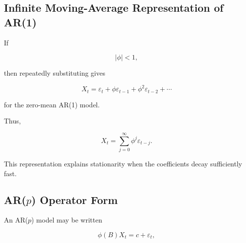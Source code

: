 
\subsection{Infinite Moving-Average Representation of AR(1)}
\label{subsec:ar1-ma-infinity}

If

\[
|\phi|<1,
\]

then repeatedly substituting gives

\[
X_t
=
\varepsilon_t
+
\phi\varepsilon_{t-1}
+
\phi^2\varepsilon_{t-2}
+
\cdots
\]

for the zero-mean AR(1) model.

Thus,

\[
\boxed{
X_t
=
\sum_{j=0}^{\infty}
\phi^j
\varepsilon_{t-j}.
}
\]

This representation explains stationarity when the coefficients decay
sufficiently fast.

\subsection{AR(\(p\)) Operator Form}
\label{subsec:arp-operator-form}

An AR(\(p\)) model may be written

\[
\boxed{
\phi(B)X_t
=
c+\varepsilon_t,
}
\]

